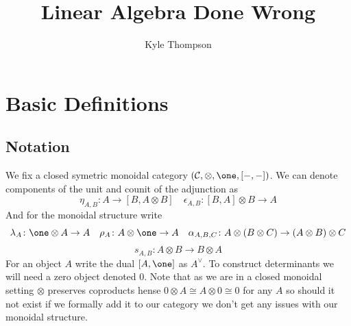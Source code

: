 \documentclass{report}
\title{Linear Algebra Done Wrong}
\author{Kyle Thompson}
\begin{document}
\maketitle
\chapter{Basic Definitions}
\section{Notation}
We fix a closed symetric monoidal category $(\mathcal{C}, \otimes, \one, [-,-])$. We can denote components of the unit and counit of the adjunction as
\[
\eta_{A,B} \colon A \to [B,A \otimes B] \quad \epsilon_{A,B} \colon [B,A] \otimes B \to A
\]
And for the monoidal structure write
\[
\lambda_A \colon \one \otimes A \to A \quad \rho_A \colon A \otimes \one \to A \quad \alpha_{A,B,C} \colon A \otimes (B \otimes C) \to (A \otimes B) \otimes C
\]
\[
s_{A,B} \colon A \otimes B \to B \otimes A
\]
For an object $A$ write the dual $[A,\one]$ as $A^\vee$. To construct determinants we will need a zero object denoted $0$. Note that as we are in a closed monoidal setting $\otimes$ preserves coproducts hense $0 \otimes A \cong A \otimes 0 \cong 0$ for any $A$ so should it not exist if we formally add it to our category we don't get any issues with our monoidal structure.
\end{document}
